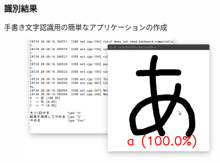 \documentclass[dvipdfmx,11pt,notheorems]{beamer}
\theoremstyle{definition}
\begin{document}
\begin{frame}\frametitle{識別結果}
手書き文字認識用の簡単なアプリケーションの作成
\begin{figure}[t]
  \begin{center}
    \includegraphics[clip,width=10cm, bb = 0 0 724 453]{./fig/png/tegaki_result.png}\\
  \end{center}
\end{figure}
\end{frame}



\end{document}
